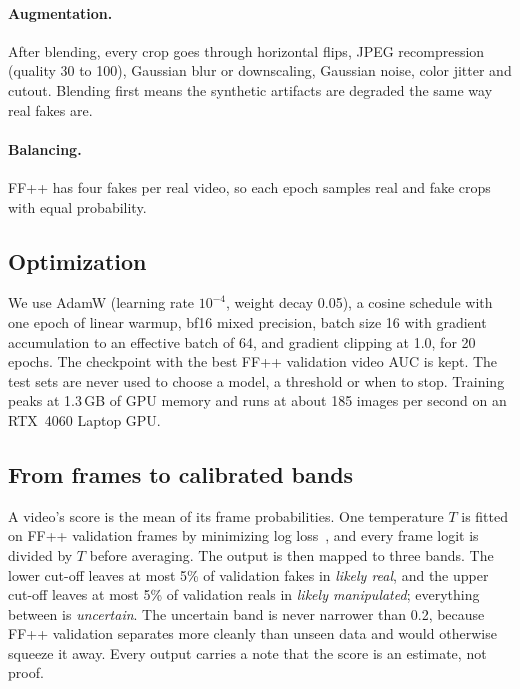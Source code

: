 \paragraph{Augmentation.} After blending, every crop goes through horizontal flips, JPEG
recompression (quality 30 to 100), Gaussian blur or downscaling, Gaussian noise, color jitter and
cutout. Blending first means the synthetic artifacts are degraded the same way real fakes are.

\paragraph{Balancing.} FF++ has four fakes per real video, so each epoch samples real and fake
crops with equal probability.

\subsection{Optimization}
We use AdamW (learning rate $10^{-4}$, weight decay 0.05), a cosine schedule with one epoch of
linear warmup, bf16 mixed precision, batch size 16 with gradient accumulation to an effective
batch of 64, and gradient clipping at 1.0, for 20 epochs. The checkpoint with the best FF++
validation video AUC is kept. The test sets are never used to choose a model, a threshold or
when to stop. Training peaks at 1.3\,GB of GPU memory and runs at about 185 images per second on
an RTX~4060 Laptop GPU.

\subsection{From frames to calibrated bands}
A video's score is the mean of its frame probabilities. One temperature $T$ is fitted on FF++
validation frames by minimizing log loss~\citep{guo2017calibration}, and every frame logit is
divided by $T$ before averaging. The output is then mapped to three bands. The lower cut-off
leaves at most 5\% of validation fakes in \emph{likely real}, and the upper cut-off leaves at
most 5\% of validation reals in \emph{likely manipulated}; everything between is
\emph{uncertain}. The uncertain band is never narrower than 0.2, because FF++ validation
separates more cleanly than unseen data and would otherwise squeeze it away. Every output
carries a note that the score is an estimate, not proof.
